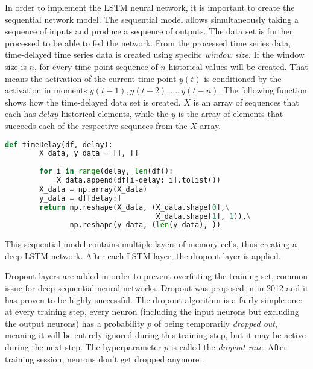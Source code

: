 In order to implement the LSTM neural network, it is important to create the sequential network model.
The sequential model allows simultaneously taking a sequence of inputs and produce a sequence of outputs.
The data set is further processed to be able to fed the network.
From the processed time series data, time-delayed time series data is created using specific \textit{window size}.
If the window size is $n$, for every time point sequence of $n$ historical values will be created.
That means the activation of the current time point $y(t)$ is conditioned by the activation in moments $y(t-1), y(t-2), ..., y(t-n)$.
The following function shows how the time-delayed data set is created. $X$ is an array of sequences that each has $delay$ historical elements, while the $y$ is the array of elements that succeeds each of the respective sequnces from the $X$ array.
\begin{lstlisting}[language=Python]
    def timeDelay(df, delay):
        X_data, y_data = [], []
        
        for i in range(delay, len(df)):
            X_data.append(df[i-delay: i].tolist())
        X_data = np.array(X_data)
        y_data = df[delay:]
        return np.reshape(X_data, (X_data.shape[0],\
                                   X_data.shape[1], 1)),\
               np.reshape(y_data, (len(y_data), ))
\end{lstlisting}
This sequential model contains multiple layers of memory cells, thus creating a deep LSTM network.
After each LSTM layer, the dropout layer is applied. 

Dropout layers are added in order to prevent overfitting the training set, common issue for deep sequential neural networks.
Dropout was proposed in \cite{dropout} in 2012 and it has proven to be highly successful.
The dropout algorithm is a fairly simple one: at every training step, every neuron (including the input neurons but excluding the output neurons) has a probability $p$ of being temporarily \textit{dropped out}, meaning it will be entirely ignored during this training step, but it may be active during the next step. 
The hyperparameter $p$ is called the \textit{dropout rate}. 
After training session, neurons don't get dropped anymore \cite{Aurelian}.

